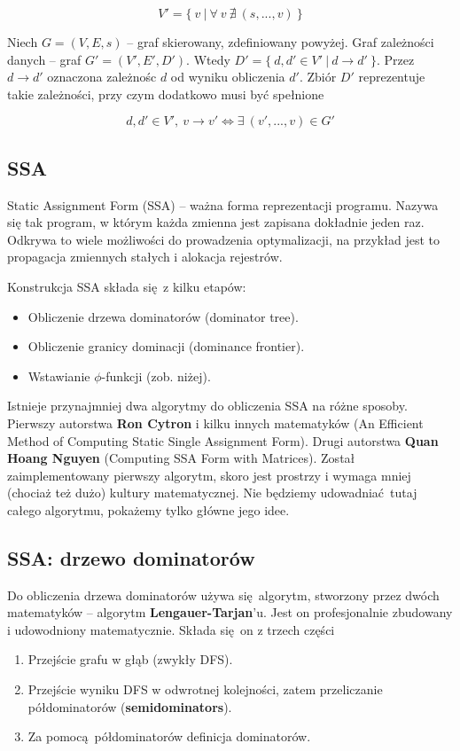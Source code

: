 \documentclass[leqno, 12pt]{article}
\newcommand{\spacing}{\vskip 0.5cm}
\begin{document}
			$$V' = \{ \ v \ | \ \forall \ v \ \nexists \ (s, ..., v) \ \}$$

			\spacing

			Niech $G = (V, E, s)$ -- graf skierowany, zdefiniowany powyżej. Graf zależności danych -- graf
			$G' = (V', E', D')$. Wtedy $D' = \{ \ d, d' \in V' \ | \ d \rightarrow d' \ \}$. Przez $d \rightarrow d'$
			oznaczona zależnośc $d$ od wyniku obliczenia $d'$. Zbiór $D'$ reprezentuje takie zależności, przy czym
			dodatkowo musi być spełnione

			$$d, d' \in V', \ v \rightarrow v' \iff \exists \ (v', ..., v) \in G' $$

			\subsection{SSA}
				Static Assignment Form (SSA) -- ważna forma reprezentacji programu. Nazywa się
				tak program, w którym każda zmienna jest zapisana dokładnie jeden raz. Odkrywa
				to wiele możliwości do prowadzenia optymalizacji, na przykład jest to propagacja
				 zmiennych stałych i alokacja rejestrów.

				Konstrukcja SSA składa się z kilku etapów:
				\begin{itemize}
					\item Obliczenie drzewa dominatorów (dominator tree).
					\item Obliczenie granicy dominacji (dominance frontier).
					\item Wstawianie $\phi$-funkcji (zob. niżej).
				\end{itemize}
				Istnieje przynajmniej dwa algorytmy do obliczenia SSA na różne sposoby. Pierwszy
				autorstwa \textbf{Ron Cytron} i kilku innych matematyków (An Efficient
				Method of Computing Static Single Assignment Form). Drugi autorstwa
				\textbf{Quan Hoang Nguyen} (Computing SSA Form with Matrices). Został
				zaimplementowany pierwszy algorytm, skoro jest prostrzy i wymaga mniej (chociaż
				też dużo) kultury matematycznej. Nie będziemy udowadniać tutaj całego algorytmu,
				pokażemy tylko główne jego idee.
				
				\subsection{SSA: drzewo dominatorów}
					Do obliczenia drzewa dominatorów używa się algorytm, stworzony przez dwóch
					matematyków -- algorytm \textbf{Lengauer-Tarjan}'u. Jest on profesjonalnie
					zbudowany i udowodniony matematycznie. Składa się on z trzech części
					\begin{enumerate}
						\item Przejście grafu w głąb (zwykły DFS).
						\item Przejście wyniku DFS w odwrotnej kolejności, zatem przeliczanie
						      półdominatorów (\textbf{semidominators}).
				      	\item Za pomocą półdominatorów definicja dominatorów.
					\end{enumerate}
\end{document}
